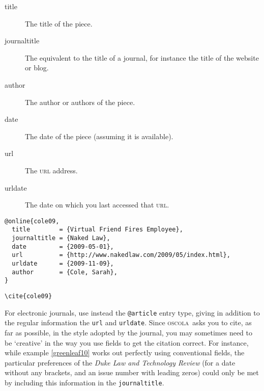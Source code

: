 \documentclass[a4paper,
               11pt,
	       DIV=1,			   
	       footinclude=false]
	      {scrartcl}
\newcommand{\oscolashort}{\textsc{oscola}\nocite{oscola}}
\newcounter{egcounter}\setcounter{egcounter}{0}
\newlength{\boxwidth}
\newenvironment{bibexample}[1][]
{%
  \medskip\par\noindent\ignorespaces
  \marginpar{[\refstepcounter{egcounter}\arabic{egcounter}]\label{#1}}%
  \setlength{\boxwidth}{0.95\linewidth}%
  \addtolength{\boxwidth}{-2\fboxsep}
  \addtolength{\boxwidth}{-2\fboxrule}
  \begin{lrbox}{\boxcontainer}
  \begin{minipage}[t]{\boxwidth}%
}
{%
  \end{minipage}\end{lrbox}%
  \colorbox{gray!30}{\usebox{\boxcontainer}}
  \par\medskip}
\newcommand{\egcite}[1]{{\texttt{\textbackslash cite#1}}}
\begin{document}
\begin{description}
\item[title] The title of the piece.
\item[journaltitle] The equivalent to the title of a journal, for instance the title of the website or blog.
\item[author] The author or authors of the piece.
\item[date] The date of the piece (assuming it is available).
\item[url] The \textsc{url} address.
\item[urldate] The date on which you last accessed that \textsc{url}.
\end{description} 

\begin{bibexample}[cole09]
\begin{verbatim}
@online{cole09,
  title        = {Virtual Friend Fires Employee},
  journaltitle = {Naked Law},
  date         = {2009-05-01},
  url          = {http://www.nakedlaw.com/2009/05/index.html},
  urldate      = {2009-11-09},
  author       = {Cole, Sarah},
}
\end{verbatim}
\end{bibexample}

\begin{description}
\item[\egcite{\{cole09\}}] \cite{cole09}
\end{description}

For electronic journals, use instead the \texttt{@article} entry type,
giving in addition to the regular information the \texttt{url} and
\texttt{urldate}.  Since \oscolashort\ asks you to cite, as far as
possible, in the style adopted by the journal, you may sometimes need
to be `creative' in the way you use fields to get the citation
correct. For instance, while example \ref{greenleaf10} works out
perfectly using conventional fields, the particular preferences of the
\emph{Duke Law and Technology Review} (for a date without any
brackets, and an issue number with leading zeros) could only be met
by including this information in the \texttt{journaltitle}.
\end{document}
